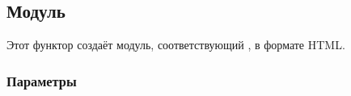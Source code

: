 \subsection{Модуль }\label{page-FPauth-strategies-module-FPauth+u+strategies-module-TOTP-module-Make+u+HTML+u+Responses}%
Этот функтор создаёт модуль, соответствующий \hyperref[page-FPauth-strategies-module-FPauth+u+strategies-module-TOTP-module-type-RESPONSES]{}, в формате HTML.

\subsubsection{Параметры\label{parameters}}%
\label{page-FPauth-strategies-module-FPauth+u+strategies-module-TOTP-module-Make+u+HTML+u+Responses-argument-1-S}\begin{ocamlindent}\label{page-FPauth-strategies-module-FPauth+u+strategies-module-TOTP-module-Make+u+HTML+u+Responses-argument-1-S-val-app+u+name}\\
\end{ocamlindent}%
\\
